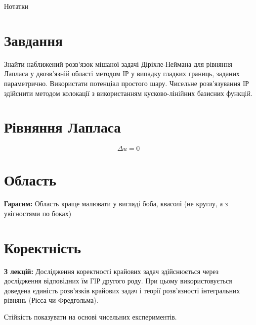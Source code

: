\documentclass[12pt,a4paper]{article}
\newcounter{e}
\begin{document}
 \begin{LARGE}
 Нотатки
 \end{LARGE}
	
 \thispagestyle{empty}
 \section{Завдання}
 Знайти наближений розв'язок мішаної задачі Діріхле-Неймана для рівняння Лапласа у двозв'язній області методом ІР у випадку гладких границь, заданих параметрично. Використати потенціал простого шару. Чисельне розв'язування ІР здійснити методом колокації з використанням кусково-лінійних базисних функцій.
 
 \section{Рівняння Лапласа}
 $$
 \Delta u = 0
 $$
 
 \section{Область}
 \textbf{Гарасим:} Область краще малювати у вигляді боба, квасолі (не круглу, а з увігностями по боках)
 
 \section{Коректність}
 \textbf{З лекцій:} Дослідження коректності крайових задач здійснюється через дослідження відповідних їм ГІР другого роду. При цьому використовується доведена єдиність розв'язків крайових задач і теорії розв'язності інтегральних рівнянь (Рісса чи Фредгольма).



 Стійкість показувати на основі чисельних експериментів.


 
\end{document}
